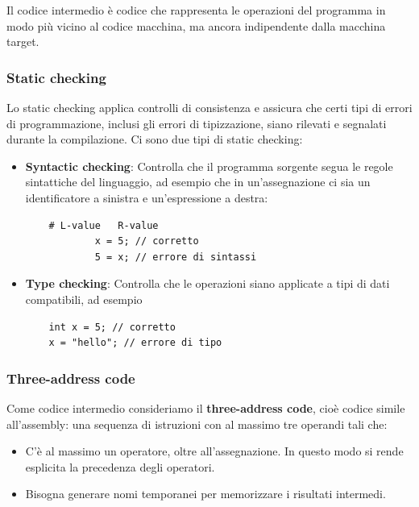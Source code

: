 \documentclass[a4paper]{article}
\begin{document}
Il codice intermedio è codice che rappresenta le operazioni del programma
in modo più vicino al codice macchina, ma ancora indipendente dalla macchina target.

\subsubsection{Static checking}
Lo static checking applica controlli di consistenza e assicura che certi tipi di
errori di programmazione, inclusi gli errori di tipizzazione, siano rilevati e
segnalati durante la compilazione. Ci sono due tipi di static checking:
\begin{itemize}
  \item \textbf{Syntactic checking}: Controlla che il programma sorgente segua le
    regole sintattiche del linguaggio, ad esempio che in un'assegnazione ci sia un
    identificatore a sinistra e un'espressione a destra:
    \begin{lstlisting}
    # L-value   R-value
            x = 5; // corretto
            5 = x; // errore di sintassi
    \end{lstlisting}

  \item \textbf{Type checking}: Controlla che le operazioni siano applicate a tipi di 
    dati compatibili, ad esempio
    \begin{lstlisting}
    int x = 5; // corretto
    x = "hello"; // errore di tipo
    \end{lstlisting}
\end{itemize}

\subsubsection{Three-address code}
Come codice intermedio consideriamo il \textbf{three-address code}, cioè
codice simile all'assembly: una sequenza di istruzioni con al massimo tre operandi tali
che:
\begin{itemize}
  \item C'è al massimo un operatore, oltre all'assegnazione. In questo modo si rende
    esplicita la precedenza degli operatori.

  \item Bisogna generare nomi temporanei per memorizzare i risultati intermedi.
\end{itemize}
\end{document}
